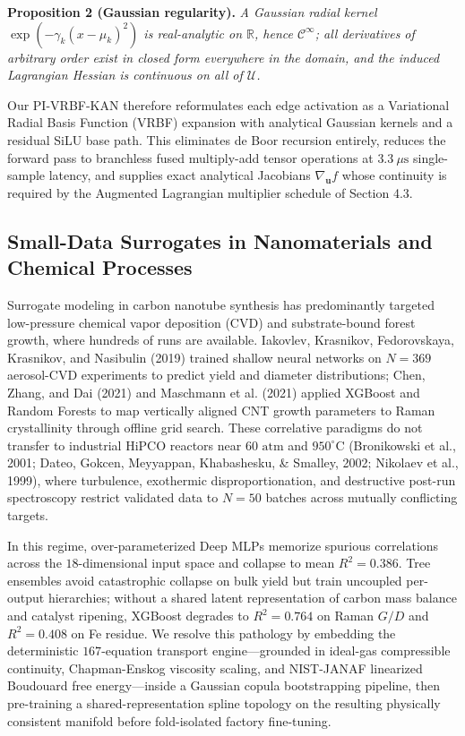 \documentclass[10pt,journal,onecolumn]{IEEEtran}
\begin{document}
\textbf{Proposition 2 (Gaussian regularity).} \textit{A Gaussian radial kernel $\exp(-\gamma_k(x - \mu_k)^2)$ is real-analytic on $\mathbb{R}$, hence $\mathcal{C}^\infty$; all derivatives of arbitrary order exist in closed form everywhere in the domain, and the induced Lagrangian Hessian is continuous on all of $\mathcal{U}$.}

Our PI-VRBF-KAN therefore reformulates each edge activation as a Variational Radial Basis Function (VRBF) expansion with analytical Gaussian kernels and a residual SiLU base path. This eliminates de Boor recursion entirely, reduces the forward pass to branchless fused multiply-add tensor operations at $3.3\ \mu\text{s}$ single-sample latency, and supplies exact analytical Jacobians $\nabla_{\mathbf{u}} f$ whose continuity is required by the Augmented Lagrangian multiplier schedule of Section 4.3.

\subsection{Small-Data Surrogates in Nanomaterials and Chemical Processes}
Surrogate modeling in carbon nanotube synthesis has predominantly targeted low-pressure chemical vapor deposition (CVD) and substrate-bound forest growth, where hundreds of runs are available. Iakovlev, Krasnikov, Fedorovskaya, Krasnikov, and Nasibulin (2019) trained shallow neural networks on $N = 369$ aerosol-CVD experiments to predict yield and diameter distributions; Chen, Zhang, and Dai (2021) and Maschmann et al. (2021) applied XGBoost and Random Forests to map vertically aligned CNT growth parameters to Raman crystallinity through offline grid search. These correlative paradigms do not transfer to industrial HiPCO reactors near $60\text{ atm}$ and $950^\circ\text{C}$ (Bronikowski et al., 2001; Dateo, Gokcen, Meyyappan, Khabashesku, & Smalley, 2002; Nikolaev et al., 1999), where turbulence, exothermic disproportionation, and destructive post-run spectroscopy restrict validated data to $N = 50$ batches across mutually conflicting targets.

In this regime, over-parameterized Deep MLPs memorize spurious correlations across the $18$-dimensional input space and collapse to mean $R^2 = 0.386$. Tree ensembles avoid catastrophic collapse on bulk yield but train uncoupled per-output hierarchies; without a shared latent representation of carbon mass balance and catalyst ripening, XGBoost degrades to $R^2 = 0.764$ on Raman $G/D$ and $R^2 = 0.408$ on Fe residue. We resolve this pathology by embedding the deterministic $167$-equation transport engine—grounded in ideal-gas compressible continuity, Chapman-Enskog viscosity scaling, and NIST-JANAF linearized Boudouard free energy—inside a Gaussian copula bootstrapping pipeline, then pre-training a shared-representation spline topology on the resulting physically consistent manifold before fold-isolated factory fine-tuning.
\end{document}
